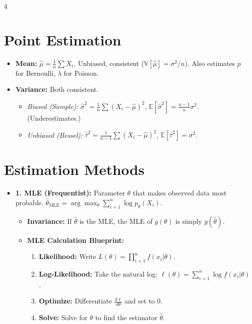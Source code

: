 \documentclass[9pt]{extarticle}
\begin{document}
\begin{multicols*}{4}
\section*{Point Estimation}
\begin{itemize}
    \item \textbf{Mean:} $\hat{\mu} = \frac{1}{n}\sum X_i$. Unbiased, consistent ($\mathbb{V}[\hat{\mu}]=\sigma^2/n$). Also estimates $p$ for Bernoulli, $\lambda$ for Poisson. 
    \item \textbf{Variance:} Both consistent. 
    \begin{itemize}
        \item \textit{Biased (Sample):} $\hat{\sigma}^2 = \frac{1}{n}\sum(X_i - \hat{\mu})^2$, $\mathbb{E}[\hat{\sigma}^2]=\frac{n-1}{n}\sigma^2$. (Underestimates.)
        \item \textit{Unbiased (Bessel):} $\hat{\tau}^2 = \frac{1}{n-1}\sum(X_i - \hat{\mu})^2$, $\mathbb{E}[\hat{\tau}^2]=\sigma^2$.
    \end{itemize}
\end{itemize}
 
\section*{Estimation Methods} 
\begin{itemize}
    \item \textbf{1. MLE (Frequentist):} Parameter $\theta$ that makes observed data most probable.
    $\hat{\theta}_{\text{MLE}} = \arg\max_{\theta} \sum_{i=1}^n \log p_\theta(X_i)$.
    \begin{itemize}
        \item \textbf{Invariance:} If $\hat{\theta}$ is the MLE, the MLE of $g(\theta)$ is simply $g(\hat{\theta})$.
        \item \textbf{MLE Calculation Blueprint:}
        \begin{enumerate}
            \item \textbf{Likelihood:} Write $L(\theta) = \prod_{i=1}^n f(x_i|\theta)$.
            \item \textbf{Log-Likelihood:} Take the natural log: $\ell(\theta) = \sum_{i=1}^n \log f(x_i|\theta)$.
            \item \textbf{Optimize:} Differentiate $\frac{d\ell}{d\theta}$ and set to $0$.
            \item \textbf{Solve:} Solve for $\theta$ to find the estimator $\hat{\theta}$.
        \end{enumerate}
    \end{itemize}
    

\end{itemize}
\end{multicols*}
\end{document}
